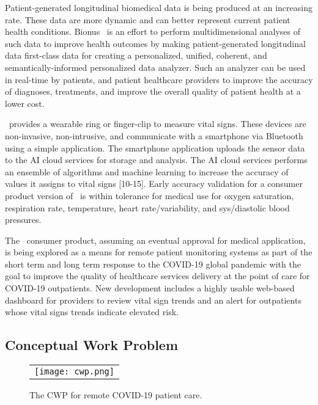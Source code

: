 Patient-generated longitudinal biomedical data is being produced at an increasing rate. These data are more dynamic and can better represent current patient health conditions. Bionus \phware\ is an effort to perform multidimensional analyses of such data to improve health outcomes by making patient-generated longitudinal data first-class data for creating a personalized, unified, coherent, and semantically-informed personalized data analyzer. Such an analyzer can be used in real-time by patients, and patient healthcare providers to improve the accuracy of diagnoses, treatments, and improve the overall quality of patient health at a lower cost.

\phware\ provides a wearable ring or finger-clip to measure vital signs. These devices are non-invasive, non-intrusive, and  communicate with a smartphone via Bluetooth using a simple application. The smartphone application uploads the sensor data to the AI cloud services for storage and analysis. The AI cloud services performs an ensemble of algorithms and machine learning to increase the accuracy of values it assigns to vital signs [10-15]. Early accuracy validation for a consumer product version of \phware\ is within tolerance for medical use for oxygen saturation, respiration rate, temperature, heart rate/variability, and sys/diastolic blood pressures.

The \phware\ consumer product, assuming an eventual approval for medical application, is being explored as a means for remote patient monitoring systems as part of the short term and long term response to the COVID-19 global pandemic with the goal to improve the quality of healthcare services delivery at the point of care for COVID-19 outpatients. New development includes a highly usable web-based dashboard for providers to review vital sign trends and an alert for outpatients whose vital signs trends indicate elevated risk. 

\subsection{Conceptual Work Problem}
\begin{figure*}
  \begin{center}
    \begin{tabular}{c}
      \texttt{[image: cwp.png]}
    \end{tabular}
  \end{center}
\caption{The CWP for remote COVID-19 patient care.}
\label{fig:cwp}
\end{figure*}

